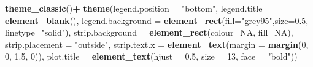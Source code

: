\documentclass[
]{article}
\newenvironment{Shaded}{\begin{snugshade}}{\end{snugshade}}
\newcommand{\DataTypeTok}[1]{\textcolor[rgb]{0.13,0.29,0.53}{#1}}
\newcommand{\DecValTok}[1]{\textcolor[rgb]{0.00,0.00,0.81}{#1}}
\newcommand{\FloatTok}[1]{\textcolor[rgb]{0.00,0.00,0.81}{#1}}
\newcommand{\KeywordTok}[1]{\textcolor[rgb]{0.13,0.29,0.53}{\textbf{#1}}}
\newcommand{\NormalTok}[1]{#1}
\newcommand{\OperatorTok}[1]{\textcolor[rgb]{0.81,0.36,0.00}{\textbf{#1}}}
\newcommand{\OtherTok}[1]{\textcolor[rgb]{0.56,0.35,0.01}{#1}}
\newcommand{\StringTok}[1]{\textcolor[rgb]{0.31,0.60,0.02}{#1}}
\begin{document}
\begin{Shaded}
\begin{Highlighting}[]
\StringTok{  }\KeywordTok{theme\_classic}\NormalTok{()}\OperatorTok{+}
\StringTok{  }\KeywordTok{theme}\NormalTok{(}\DataTypeTok{legend.position =} \StringTok{"bottom"}\NormalTok{, }\DataTypeTok{legend.title =} \KeywordTok{element\_blank}\NormalTok{(), }\DataTypeTok{legend.background =} \KeywordTok{element\_rect}\NormalTok{(}\DataTypeTok{fill=}\StringTok{"grey95"}\NormalTok{,}\DataTypeTok{size=}\FloatTok{0.5}\NormalTok{, }\DataTypeTok{linetype=}\StringTok{"solid"}\NormalTok{), }\DataTypeTok{strip.background =} \KeywordTok{element\_rect}\NormalTok{(}\DataTypeTok{colour=}\OtherTok{NA}\NormalTok{, }\DataTypeTok{fill=}\OtherTok{NA}\NormalTok{), }\DataTypeTok{strip.placement =} \StringTok{"outside"}\NormalTok{, }\DataTypeTok{strip.text.x =} \KeywordTok{element\_text}\NormalTok{(}\DataTypeTok{margin =} \KeywordTok{margin}\NormalTok{(}\DecValTok{0}\NormalTok{, }\DecValTok{0}\NormalTok{, }\FloatTok{1.5}\NormalTok{, }\DecValTok{0}\NormalTok{)), }\DataTypeTok{plot.title =} \KeywordTok{element\_text}\NormalTok{(}\DataTypeTok{hjust =} \FloatTok{0.5}\NormalTok{, }\DataTypeTok{size =} \DecValTok{13}\NormalTok{, }\DataTypeTok{face =} \StringTok{"bold"}\NormalTok{))}
\end{Highlighting}
\end{Shaded}
\end{document}
